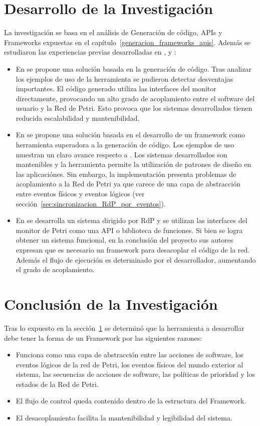 \section{Desarrollo de la Investigación}
\label{sec:investigacion_desarrollo}
La investigación se basa en el análisis de Generación de código, APIs y
Frameworks expuestas en el capítulo~\ref{generacion_frameworks_apis}. Además se
estudiaron las experiencias previas desarrolladas en \cite{codegen}, \cite{chimp} y
\cite{Bentivegna-Ludemann}:
\begin{itemize}
  \item En \cite{codegen} se propone una solución basada en la generación de
  código. Tras analizar los ejemplos de uso de la herramienta se pudieron
  detectar desventajas importantes. El código generado utiliza las interfaces
  del monitor directamente, provocando un alto grado de acoplamiento entre el
  software del usuario y la Red de Petri. Esto provoca que los sistemas
  desarrollados tienen reducida escalabilidad y mantenibilidad.
  \item En \cite{chimp} se propone una solución basada en el desarrollo de un
  framework como herramienta superadora a la generación de código. Los ejemplos
  de uso muestran un claro avance respecto a \cite{codegen}. Los
  sistemas desarrollados son mantenibles y la herramienta permite la
  utilización de patrones de diseño en las aplicaciónes.
  Sin embargo, la implementación presenta problemas de acoplamiento a la Red de
  Petri ya que carece de una capa de abstracción entre eventos físicos y eventos
  lógicos (ver sección~\ref{sec:sincronizacion_RdP_por_eventos}).
  \item En \cite{Bentivegna-Ludemann} se desarrolla un sistema dirigido por RdP
  y se utilizan las interfaces del monitor de Petri como una API o
  biblioteca de funciones. Si bien se logra obtener un sistema funcional, en la
  conclusión del proyecto sus autores expresan que es necesario un framework
  para desacoplar el código de la red. Además el flujo de ejecución es
  determinado por el desarrollador, aumentando el grado de acoplamiento.
\end{itemize}

\section{Conclusión de la Investigación}
Tras lo expuesto en la sección~\ref{sec:investigacion_desarrollo} se determinó
que la herramienta a desarrollar debe tener la forma de un Framework por las
siguientes razones:
\begin{itemize}
  \item Funciona como una capa de abstracción entre las acciones de software,
  los eventos lógicos de la red de Petri, los eventos físicos del mundo
  exterior al sistema, las secuencias de acciones de software, las políticas de
  prioridad y los estados de la Red de Petri.
  \item El flujo de control queda contenido dentro de la estructura del
  Framework.
  \item El desacoplamiento facilita la mantenibilidad y legibilidad del sistema.
\end{itemize} 
